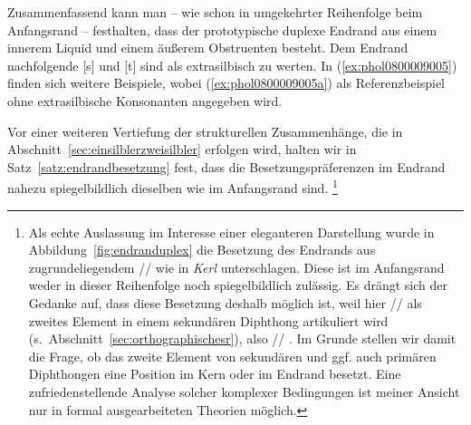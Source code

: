 Zusammenfassend kann man -- wie schon in umgekehrter Reihenfolge beim Anfangsrand -- festhalten, dass der prototypische duplexe Endrand aus einem innerem Liquid und einem äußerem Obstruenten besteht.
Dem Endrand nachfolgende [s] und [t] sind als extrasilbisch zu werten.
In (\ref{ex:phol0800009005}) finden sich weitere Beispiele, wobei (\ref{ex:phol0800009005a}) als Referenzbeispiel ohne extrasilbische Konsonanten angegeben wird.

\begin{exe}
  \ex \label{ex:phol0800009005}
  \begin{xlist}
  \end{xlist}
\end{exe}

Vor einer weiteren Vertiefung der strukturellen Zusammenhänge, die in Abschnitt~\ref{sec:einsilblerzweisilbler} erfolgen wird, halten wir in Satz~\ref{satz:endrandbesetzung} fest, dass die Besetzungspräferenzen im Endrand nahezu spiegelbildlich dieselben wie im Anfangsrand sind.%
\footnote{Als echte Auslassung im Interesse einer eleganteren Darstellung wurde in Abbildung~\ref{fig:endranduplex} die Besetzung des Endrands aus zugrundeliegendem // wie in \textit{Kerl} unterschlagen.
Diese ist im Anfangsrand weder in dieser Reihenfolge noch spiegelbildlich zulässig.
Es drängt sich der Gedanke auf, dass diese Besetzung deshalb möglich ist, weil hier // als zweites Element in einem sekundären Diphthong artikuliert wird (s.\ Abschnitt~\ref{sec:orthographischesr}), also // \phopro \textipa{[k\t{E@}l]}.
Im Grunde stellen wir damit die Frage, ob das zweite Element von sekundären und ggf. auch primären Diphthongen eine Position im Kern oder im Endrand besetzt. 
Eine zufriedenstellende Analyse solcher komplexer Bedingungen ist meiner Ansicht nur in formal ausgearbeiteten Theorien möglich.}



